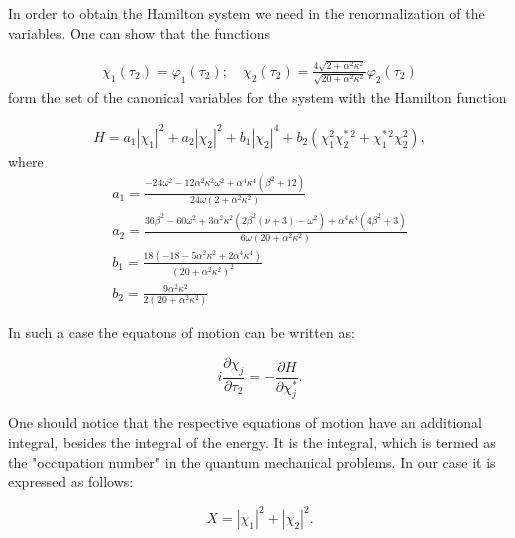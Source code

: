 In order to obtain the Hamilton system we need in the renormalization of the variables.
One can show that the functions

\begin{eqnarray}\label{eq:varchi}
\chi_{1}(\tau_2) = \varphi_{1}(\tau_2); \quad \chi_{2}(\tau_2)= \frac{4 \sqrt{2+\alpha^2 \kappa^2}}{\sqrt{20+\alpha^2 \kappa^2}} \varphi_{2}(\tau_2)
\end{eqnarray}
form the set of the canonical variables for the system with the Hamilton function

\begin{eqnarray}\label{eq:Hamiltonian1}
H = a_{1} |\chi_{1}|^2 + a_{2} |\chi_{2}|^2+b_{1} |\chi_{2}|^4 +b_{2} \left( \chi_{1}^2 \chi_{2}^{* \, 2}+\chi_{1}^{* \, 2} \chi_{2}^2 \right),
\end{eqnarray}
where
\begin{eqnarray}\label{eq:coeff1}
a_{1} =   \frac{-24 \omega ^2-12 \alpha ^2 \kappa ^2 \omega ^2+\alpha ^4  \kappa ^4 \left(\beta ^2+12\right)}{24 \omega  \left(2+\alpha ^2 \kappa ^2 \right)} \nonumber  \\
a_{2} =   \frac{36 \beta ^2-60 \omega ^2+3 \alpha ^2 \kappa ^2 \left(2 \beta ^2 (\nu +3)-\omega ^2\right)+\alpha ^4 \kappa ^4 \left(4 \beta ^2+3\right) }{6 \omega  \left(20+ \alpha ^2 \kappa ^2 \right)}  \\
b_{1} =    \frac{18 \left(-18-5 \alpha ^2 \kappa ^2 +2 \alpha ^4 \kappa ^4 \right)}{ \left(20+\alpha ^2 \kappa ^2 \right)^2} \nonumber \\
b_{2} =   \frac{9 \alpha ^2 \kappa ^2}{2 \left(20+\alpha ^2 \kappa ^2 \right)}  \nonumber
\end{eqnarray}

In such a case the equatons of motion can be written as:

\begin{equation}
i \frac{\partial \chi_{j}}{\partial \tau_{2}} = -\frac{\partial H}{\partial \chi_{j}^{*}}.
\end{equation}

One should notice that the respective equations of motion have an additional integral, besides the integral of the energy.
It is the integral, which is termed as the "occupation number" in the quantum mechanical problems.
In our case it is expressed as follows:

\begin{equation}\label{eq:occupation}
X = |\chi_{1}|^2+|\chi_{2}|^2.
\end{equation}

